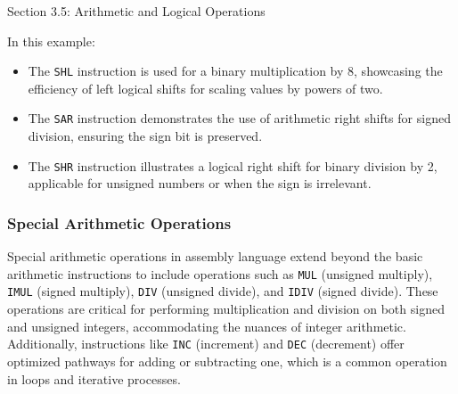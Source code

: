 \begin{notes}{Section 3.5: Arithmetic and Logical Operations}
\begin{highlight}
        In this example:
    
        \begin{itemize}
            \item The \texttt{SHL} instruction is used for a binary multiplication by 8, showcasing the efficiency of left logical shifts for scaling values by powers of two.
            \item The \texttt{SAR} instruction demonstrates the use of arithmetic right shifts for signed division, ensuring the sign bit is preserved.
            \item The \texttt{SHR} instruction illustrates a logical right shift for binary division by 2, applicable for unsigned numbers or when the sign is irrelevant.
        \end{itemize}
    \end{highlight}

    \subsubsection*{Special Arithmetic Operations}

    Special arithmetic operations in assembly language extend beyond the basic arithmetic instructions to include operations such as \texttt{MUL} (unsigned multiply), \texttt{IMUL} (signed multiply), 
    \texttt{DIV} (unsigned divide), and \texttt{IDIV} (signed divide). These operations are critical for performing multiplication and division on both signed and unsigned integers, accommodating the 
    nuances of integer arithmetic. Additionally, instructions like \texttt{INC} (increment) and \texttt{DEC} (decrement) offer optimized pathways for adding or subtracting one, which is a common 
    operation in loops and iterative processes.
    

\end{notes}

